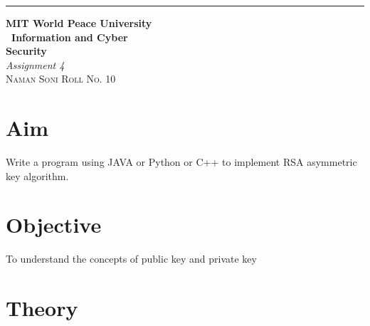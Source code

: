 \documentclass{article}
\begin{document}
	\begin{titlepage} %
	
	\raggedleft\rule{1pt}{\textheight} %
	\hspace{0.05\textwidth} %
	\parbox[b]{0.75\textwidth}
	{ %
		
		{\Huge\bfseries MIT World Peace University \\[0.5\baselineskip] \ Information and Cyber \\ Security}\\[2\baselineskip] %
		{\large\textit{Assignment 4}}\\[4\baselineskip] %
		{\Large\textsc{Naman Soni Roll No. 10}} %
		
		\vspace{0.5\textheight} %
	}
	
\end{titlepage}
\tableofcontents
\pagebreak
\section{\textbf{Aim}}
Write a program using JAVA or Python or C++ to implement RSA asymmetric key algorithm.
\section{\textbf{Objective}}
To understand the concepts of public key and private key
\section{\textbf{Theory}}
\end{document}
